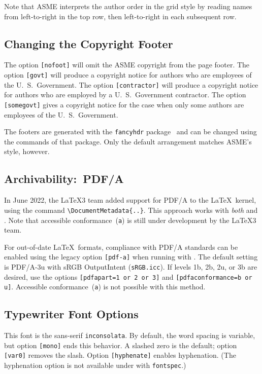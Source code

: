\documentclass[captionpatch,colorlinks,upint,subscriptcorrection,varvw,german]{asmeconf}
\begin{document}
Note that ASME interprets the author order in the grid style by reading names from left-to-right in the top row, then left-to-right in each subsequent row.

\subsection{Changing the Copyright Footer} The option \texttt{[nofoot]} will omit the ASME copyright from the page footer. The option \texttt{[govt]} will produce a copyright notice for authors who are employees of the U.\ S.\ Government.  
The option \texttt{[contractor]} will produce a copyright
notice for authors who are employed by a U.\ S.\ Government contractor.
The option \texttt{[somegovt]} gives a copyright notice for the case when only some authors are employees of the U.\ S.\ Government.

The footers are generated with the \texttt{fancyhdr} package~\cite{oostrum} and can be changed using the commands of that package. Only the default arrangement matches ASME's style, however.

\subsection{Archivability:~PDF/A} In June 2022, the \LaTeX 3 team added support for PDF/A to the \LaTeX\ kernel, using the command \verb|\DocumentMetadata{..}|. This approach works with \textit{both}  and . Note that accessible  conformance~(\texttt{a}) is still under development by the  \LaTeX3 team.

For out-of-date \LaTeX\ formats, compliance with PDF/A standards can be enabled using the legacy option \texttt{[pdf-a]} when running with . The default setting is PDF/A-3u with sRGB OutputIntent (\texttt{sRGB.icc}). If levels 1b, 2b, 2u, or 3b are desired, use the
options \texttt{[pdfapart=1 or 2 or 3]} and  \texttt{[pdfaconformance=b or u]}. Accessible  conformance~(\texttt{a}) is not possible with this method. 

\subsection{Typewriter Font Options} This font is the sans-serif \texttt{inconsolata}. By default, the word spacing is variable, but option \texttt{[mono]} ends this behavior. A slashed zero is the default; option \texttt{[var0]} removes the slash. Option \texttt{[hyphenate]} enables hyphenation. (The hyphenation option is not available under  with \texttt{fontspec}.)
\end{document}
